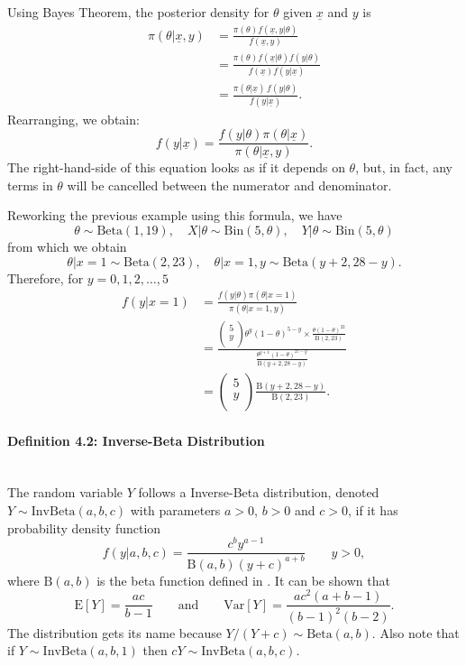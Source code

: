 Using Bayes Theorem, the posterior density for $\theta$ given
$\underline{x}$ and $y$ is
\begin{align*}
\pi(\theta|\underline{x},y)&=\frac{\pi(\theta)f(\underline{x},y|\theta)}{f(\underline{x},y)}\\
&=\frac{\pi(\theta)f(\underline{x}|\theta)f(y|\theta)}{f(\underline{x})f(y|\underline{x})}
\\
&=\frac{\pi(\theta|\underline{x})\,f(y|\theta)}{f(y|\underline{x})}.
\end{align*}
Rearranging, we obtain:
$$f(y|\underline{x}) =\frac{f(y|\theta)\pi(\theta|\underline{x})}{\pi(\theta|\underline{x},y)}.$$
The right-hand-side of this equation looks as if it depends on
$\theta$, but, in fact, any terms in $\theta$ will be cancelled
between the numerator and denominator.

Reworking the previous example using this formula, we have
$$
\theta\sim \mathrm{Beta}(1,19),\quad X|\theta\sim \mathrm{Bin}(5,\theta),\quad 
Y|\theta\sim \mathrm{Bin}(5,\theta)
$$
from which we obtain
$$
\theta|x=1\sim \mathrm{Beta}(2,23),\quad \theta|x=1,y\sim \mathrm{Beta}(y+2,28-y).
$$
Therefore, for $y=0,1,2,\ldots,5$
\begin{align*}
f(y|x=1)&=\frac{f(y|\theta)\pi(\theta|x=1)}{\pi(\theta|x=1,y)}\\
{}
&=\frac{\begin{pmatrix} 5 \\ y \\ \end{pmatrix} 
\theta^y(1-\theta)^{5-y}
\times \frac{\theta(1-\theta)^{22}}{\mathrm{B}(2,23)}}
{\frac{\theta^{y+1}(1-\theta)^{27-y}}{\mathrm{B}(y+2,28-y)}}\\ 
{}
&=\begin{pmatrix} 5 \\ y \\ \end{pmatrix} \frac{\mathrm{B}(y+2,28-y)}{\mathrm{B}(2,23)}.
\end{align*}

\clearpage

\paragraph{Definition 4.2: Inverse-Beta Distribution}{~\\
The random variable $Y$ follows a Inverse-Beta distribution, denoted $Y\sim\mathrm{InvBeta}(a,b,c)$ with parameters $a>0$, $b>0$ and $c>0$,  if it has probability density function
$$
f(y|a,b,c)=\frac{c^by^{a-1}}{\mathrm{B}(a,b)(y+c)^{a+b}} \quad\quad y>0, 
$$
where $\mathrm{B}(a,b)$ is the beta function defined in
. It can be shown that
$$\text{E}[Y]=\frac{ac}{b-1}\quad\quad\text{and}\quad\quad \text{Var}[Y]=\frac{ac^2(a+b-1)}{(b-1)^2(b-2)}.$$
The distribution gets its name because $Y/(Y+c)\sim \mathrm{Beta}(a,b)$. Also note that if $Y\sim \mathrm{InvBeta}(a,b,1)$ then $cY\sim \mathrm{InvBeta}(a,b,c)$.}

